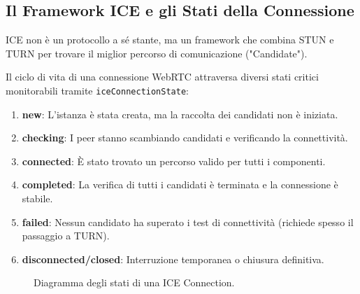 \documentclass[11pt,a4paper]{report}
\begin{document}
\subsection{Il Framework ICE e gli Stati della Connessione}
ICE non è un protocollo a sé stante, ma un framework che combina STUN e TURN per trovare il miglior percorso di comunicazione ("Candidate").

Il ciclo di vita di una connessione WebRTC attraversa diversi stati critici monitorabili tramite \texttt{iceConnectionState}:

\begin{enumerate}
    \item \textbf{new}: L'istanza è stata creata, ma la raccolta dei candidati non è iniziata.
    \item \textbf{checking}: I peer stanno scambiando candidati e verificando la connettività.
    \item \textbf{connected}: \`E stato trovato un percorso valido per tutti i componenti.
    \item \textbf{completed}: La verifica di tutti i candidati è terminata e la connessione è stabile.
    \item \textbf{failed}: Nessun candidato ha superato i test di connettività (richiede spesso il passaggio a TURN).
    \item \textbf{disconnected/closed}: Interruzione temporanea o chiusura definitiva.
\end{enumerate}

\begin{figure}[ht]
\centering
{}
\caption{Diagramma degli stati di una ICE Connection.}
\end{figure}
\end{document}
